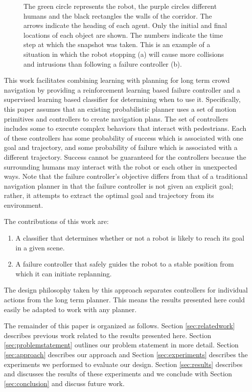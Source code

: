 \documentclass[letterpaper, 10 pt, conference]{ieeeconf}  %
\begin{document}
\begin{figure}
\begin{subfigure}[t]{0.49\linewidth}
			\caption{}
			\label{fig:rlmotivation}
		\end{subfigure}
		\caption{The green circle represents the robot, the purple circles different humans and the black rectangles the walls of the corridor. The arrows indicate the heading of each agent. Only the initial and final locations of each object are shown. The numbers indicate the time step at which the snapshot was taken. This is an example of a situation in which the robot stopping (a) will cause more collisions and intrusions than following a failure controller (b).}
		\label{fig:motivation}
	\end{figure}
	
	This work facilitates combining learning with planning for long term crowd navigation by providing a reinforcement learning based failure controller and a supervised learning based classifier for determining when to use it. Specifically, this paper assumes that an existing probabilistic planner uses a set of motion primitives and controllers to create navigation plans. The set of controllers includes some to execute complex behaviors that interact with pedestrians. Each of these controllers has some probability of success which is associated with one goal and trajectory, and some probability of failure which is associated with a different trajectory. Success cannot be guaranteed for the controllers because the surrounding humans may interact with the robot or each other in unexpected ways. Note that the failure controller's objective differs from that of a traditional navigation planner in that the failure controller is not given an explicit goal; rather, it attempts to extract the optimal goal and trajectory from its environment.

	The contributions of this work are:
	\begin{enumerate}
		\item A classifier that determines whether or not a robot is likely to reach its goal in a given scene.
		\item A failure controller that safely guides the robot to a stable position from which it can initiate replanning.
	\end{enumerate}
	The design philosophy taken by this approach separates controllers for individual actions from the long term planner. This means the results presented here could easily be adapted to work with any planner.
	
	The remainder of this paper is organized as follows. Section \ref{sec:relatedwork} describes previous work related to the results presented here. Section \ref{sec:problemstatement} outlines our problem statement in more detail. Section \ref{sec:approach} describes our approach and Section \ref{sec:experiments} describes the experiments we performed to evaluate our design. Section \ref{sec:results} describes and discusses the results of these experiments and we conclude with Section \ref{sec:conclusion} and discuss future work.
	
\end{document}
